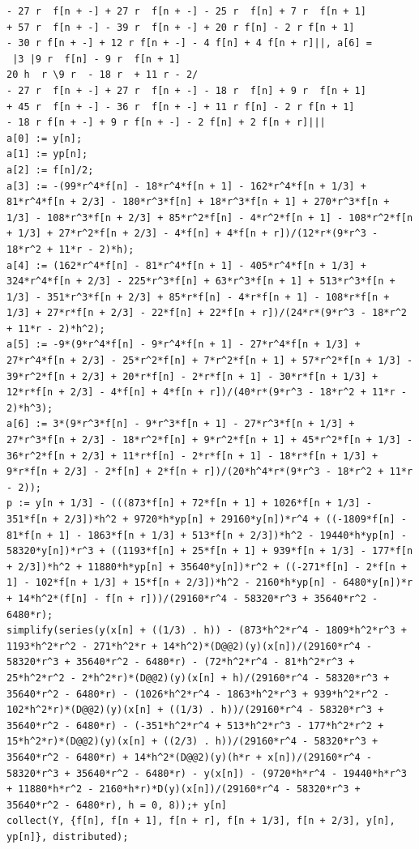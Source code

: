 \documentclass[12pt]{article}
\begin{document}
\begin{verbatim}
- 27 r  f[n + -] + 27 r  f[n + -] - 25 r  f[n] + 7 r  f[n + 1]
+ 57 r  f[n + -] - 39 r  f[n + -] + 20 r f[n] - 2 r f[n + 1]
- 30 r f[n + -] + 12 r f[n + -] - 4 f[n] + 4 f[n + r]||, a[6] = 
 |3 |9 r  f[n] - 9 r  f[n + 1]
20 h  r \9 r  - 18 r  + 11 r - 2/                              
- 27 r  f[n + -] + 27 r  f[n + -] - 18 r  f[n] + 9 r  f[n + 1]
+ 45 r  f[n + -] - 36 r  f[n + -] + 11 r f[n] - 2 r f[n + 1]
- 18 r f[n + -] + 9 r f[n + -] - 2 f[n] + 2 f[n + r]||| 
a[0] := y[n];
a[1] := yp[n];
a[2] := f[n]/2;
a[3] := -(99*r^4*f[n] - 18*r^4*f[n + 1] - 162*r^4*f[n + 1/3] + 81*r^4*f[n + 2/3] - 180*r^3*f[n] + 18*r^3*f[n + 1] + 270*r^3*f[n + 1/3] - 108*r^3*f[n + 2/3] + 85*r^2*f[n] - 4*r^2*f[n + 1] - 108*r^2*f[n + 1/3] + 27*r^2*f[n + 2/3] - 4*f[n] + 4*f[n + r])/(12*r*(9*r^3 - 18*r^2 + 11*r - 2)*h);
a[4] := (162*r^4*f[n] - 81*r^4*f[n + 1] - 405*r^4*f[n + 1/3] + 324*r^4*f[n + 2/3] - 225*r^3*f[n] + 63*r^3*f[n + 1] + 513*r^3*f[n + 1/3] - 351*r^3*f[n + 2/3] + 85*r*f[n] - 4*r*f[n + 1] - 108*r*f[n + 1/3] + 27*r*f[n + 2/3] - 22*f[n] + 22*f[n + r])/(24*r*(9*r^3 - 18*r^2 + 11*r - 2)*h^2);
a[5] := -9*(9*r^4*f[n] - 9*r^4*f[n + 1] - 27*r^4*f[n + 1/3] + 27*r^4*f[n + 2/3] - 25*r^2*f[n] + 7*r^2*f[n + 1] + 57*r^2*f[n + 1/3] - 39*r^2*f[n + 2/3] + 20*r*f[n] - 2*r*f[n + 1] - 30*r*f[n + 1/3] + 12*r*f[n + 2/3] - 4*f[n] + 4*f[n + r])/(40*r*(9*r^3 - 18*r^2 + 11*r - 2)*h^3);
a[6] := 3*(9*r^3*f[n] - 9*r^3*f[n + 1] - 27*r^3*f[n + 1/3] + 27*r^3*f[n + 2/3] - 18*r^2*f[n] + 9*r^2*f[n + 1] + 45*r^2*f[n + 1/3] - 36*r^2*f[n + 2/3] + 11*r*f[n] - 2*r*f[n + 1] - 18*r*f[n + 1/3] + 9*r*f[n + 2/3] - 2*f[n] + 2*f[n + r])/(20*h^4*r*(9*r^3 - 18*r^2 + 11*r - 2));
p := y[n + 1/3] - (((873*f[n] + 72*f[n + 1] + 1026*f[n + 1/3] - 351*f[n + 2/3])*h^2 + 9720*h*yp[n] + 29160*y[n])*r^4 + ((-1809*f[n] - 81*f[n + 1] - 1863*f[n + 1/3] + 513*f[n + 2/3])*h^2 - 19440*h*yp[n] - 58320*y[n])*r^3 + ((1193*f[n] + 25*f[n + 1] + 939*f[n + 1/3] - 177*f[n + 2/3])*h^2 + 11880*h*yp[n] + 35640*y[n])*r^2 + ((-271*f[n] - 2*f[n + 1] - 102*f[n + 1/3] + 15*f[n + 2/3])*h^2 - 2160*h*yp[n] - 6480*y[n])*r + 14*h^2*(f[n] - f[n + r]))/(29160*r^4 - 58320*r^3 + 35640*r^2 - 6480*r);
simplify(series(y(x[n] + ((1/3) . h)) - (873*h^2*r^4 - 1809*h^2*r^3 + 1193*h^2*r^2 - 271*h^2*r + 14*h^2)*(D@@2)(y)(x[n])/(29160*r^4 - 58320*r^3 + 35640*r^2 - 6480*r) - (72*h^2*r^4 - 81*h^2*r^3 + 25*h^2*r^2 - 2*h^2*r)*(D@@2)(y)(x[n] + h)/(29160*r^4 - 58320*r^3 + 35640*r^2 - 6480*r) - (1026*h^2*r^4 - 1863*h^2*r^3 + 939*h^2*r^2 - 102*h^2*r)*(D@@2)(y)(x[n] + ((1/3) . h))/(29160*r^4 - 58320*r^3 + 35640*r^2 - 6480*r) - (-351*h^2*r^4 + 513*h^2*r^3 - 177*h^2*r^2 + 15*h^2*r)*(D@@2)(y)(x[n] + ((2/3) . h))/(29160*r^4 - 58320*r^3 + 35640*r^2 - 6480*r) + 14*h^2*(D@@2)(y)(h*r + x[n])/(29160*r^4 - 58320*r^3 + 35640*r^2 - 6480*r) - y(x[n]) - (9720*h*r^4 - 19440*h*r^3 + 11880*h*r^2 - 2160*h*r)*D(y)(x[n])/(29160*r^4 - 58320*r^3 + 35640*r^2 - 6480*r), h = 0, 8));+ y[n]
collect(Y, {f[n], f[n + 1], f[n + r], f[n + 1/3], f[n + 2/3], y[n], yp[n]}, distributed);


\end{verbatim}
\end{document}
